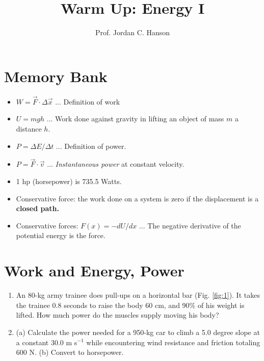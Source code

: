 \documentclass{article}
\begin{document}
\twocolumn

\title{Warm Up: Energy I}
\author{Prof. Jordan C. Hanson}

\maketitle

\section{Memory Bank}

\begin{itemize}
\item $W = \vec{F} \cdot \Delta \vec{x}$ ... Definition of work
\item $U = mgh$ ... Work done against gravity in lifting an object of mass $m$ a distance $h$.
\item $P = \Delta E / \Delta t$ ... Definition of power.
\item $P = \vec{F} \cdot \vec{v}$ ... \textit{Instantaneous power} at constant velocity.
\item 1 hp (horsepower) is 735.5 Watts.
\item Conservative force: the work done on a system is zero if the displacement is a \textbf{closed path.}
\item Conservative forces: $F(x) = -dU/dx$ ... The negative derivative of the potential energy is the force.
\end{itemize}

\section{Work and Energy, Power}

\begin{enumerate}
\item An 80-kg army trainee does pull-ups on a horizontal bar (Fig. \ref{fig:1}). It takes the trainee 0.8 seconds to raise the body 60 cm, and 90\% of his weight is lifted. How much power do the muscles supply moving his body? \\ \vspace{2cm}
\item (a) Calculate the power needed for a 950-kg car to climb a 5.0 degree slope at a constant 30.0 m s$^{-1}$ while encountering wind resistance and friction totaling 600 N. (b) Convert to horsepower. \\ \vspace{2cm}
\end{enumerate}
\end{document}
